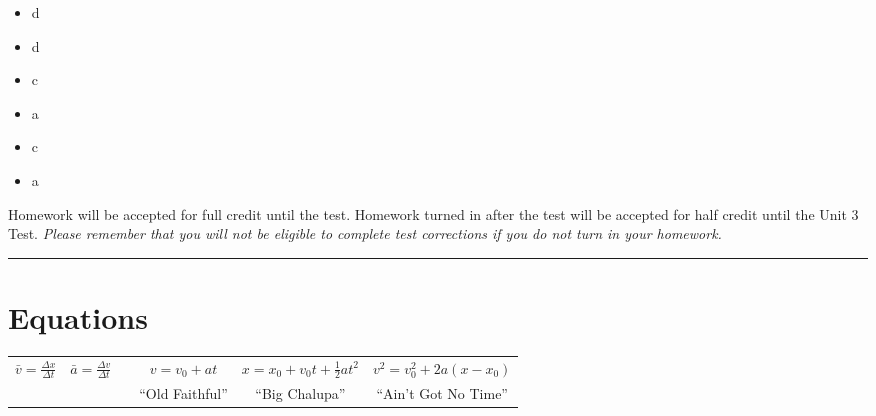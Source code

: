 \documentclass[10pt]{exam}
\newcommand{\printeqs}{
  \section*{Equations} 
  
  \begin{center}
    \begin{tabular}{cccccc}
      $\bar{v} = \frac{\Delta x}{\Delta t}$       &   
      $\bar{a} = \frac{\Delta v}{\Delta t}$       &&
      $v = v_0 + a t$                             &
      $x = x_0 + v_0t + \frac{1}{2}at^2$          &
      $v^2 = v_0^2 + 2a \left( x - x_0 \right) $  \\
          & & & ``Old Faithful'' & ``Big Chalupa'' & ``Ain't Got No Time'' \\
    \end{tabular}
  \end{center}
}
\begin{document}
\begin{multicols}{9}

  \begin{itemize}[noitemsep]
    \item[2.] d 
    \item[3.] d 
    \item[4.] c 
    \item[5.] a
    \item[6.] c
    \item[9.] a
    
  \end{itemize}
  
\end{multicols}
  
\noindent
{\footnotesize Homework will be accepted for full credit until the test.
Homework turned in after the test will be accepted for half credit
until the Unit 3 Test.
\emph{Please remember that you will not be eligible to complete 
test corrections if you do not turn in your homework.}}

\vspace{1em}
\hrule 
\printeqs
\end{document}
